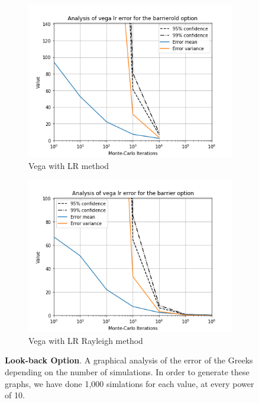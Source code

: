 \documentclass[11pt,a4paper,fleqn]{article}
\begin{document}
\begin{figure}[h!]
      \begin{subfigure}[b]{0.45\textwidth}
          \includegraphics[width=\textwidth]{graphs/barrieroldvegalr.png}
          \caption{Vega with LR method}
      \end{subfigure}
      \begin{subfigure}[b]{0.45\textwidth}
          \includegraphics[width=\textwidth]{graphs/barriervegalr.png}
          \caption{Vega with LR Rayleigh method}
      \end{subfigure}

      \caption{\textbf{Look-back Option}. A graphical analysis of the error of the Greeks depending on the number of simulations. In order to generate these graphs, we have done 1,000 simlations for each value, at every power of 10.}
\end{figure}
\end{document}

